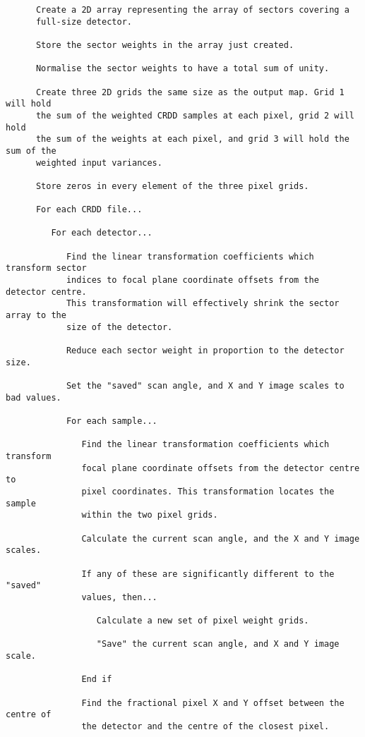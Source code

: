 \begin{verbatim}
      Create a 2D array representing the array of sectors covering a 
      full-size detector.

      Store the sector weights in the array just created.

      Normalise the sector weights to have a total sum of unity.

      Create three 2D grids the same size as the output map. Grid 1 will hold 
      the sum of the weighted CRDD samples at each pixel, grid 2 will hold 
      the sum of the weights at each pixel, and grid 3 will hold the sum of the 
      weighted input variances.

      Store zeros in every element of the three pixel grids.

      For each CRDD file...

         For each detector...

            Find the linear transformation coefficients which transform sector 
            indices to focal plane coordinate offsets from the detector centre. 
            This transformation will effectively shrink the sector array to the 
            size of the detector.

            Reduce each sector weight in proportion to the detector size.

            Set the "saved" scan angle, and X and Y image scales to bad values.

            For each sample...
      
               Find the linear transformation coefficients which transform 
               focal plane coordinate offsets from the detector centre to 
               pixel coordinates. This transformation locates the sample 
               within the two pixel grids.

               Calculate the current scan angle, and the X and Y image scales.

               If any of these are significantly different to the "saved" 
               values, then...
                  
                  Calculate a new set of pixel weight grids.

                  "Save" the current scan angle, and X and Y image scale.

               End if

               Find the fractional pixel X and Y offset between the centre of 
               the detector and the centre of the closest pixel.


\end{verbatim}
